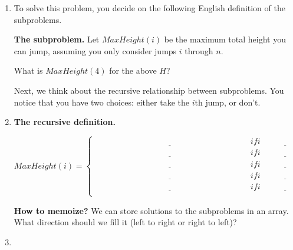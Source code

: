 \documentclass[11pt]{article}
\begin{document}
\begin{enumerate}
\begin{enumerate}
    What is the optimal set of jumps to take and what is the total height?
    \vspace{1in}

\item To solve this problem, you decide on the following English definition of the subproblems.

    \textbf{The subproblem.} Let $MaxHeight(i)$ be the maximum total height you can jump,
    assuming you only consider jumps $i$ through $n$.

    What is $MaxHeight(4)$ for the above $H$?
    \vspace{1in}

    Next, we think about the recursive relationship between subproblems.  You notice that you have two
    choices: either take the $i$th jump, or don't.
    \item 
    \textbf{The recursive definition.} 


    \begin{equation*}
        MaxHeight(i) =
        \begin{cases}
        \underline{\hspace{3in}} & if i \underline{\hspace{1in}} \\
        \underline{\hspace{3in}} & if i \underline{\hspace{1in}} \\
        \underline{\hspace{3in}} & if i \underline{\hspace{1in}} \\
        \underline{\hspace{3in}} & if i \underline{\hspace{1in}} \\
        \underline{\hspace{3in}} & if i \underline{\hspace{1in}} \\
        \end{cases}
    \end{equation*}

    \newpage

    \textbf{How to memoize?}
    We can store solutions to the subproblems in an array. What direction should we fill it (left to right or right to left)?
    \vspace{1in}

    \item 


\end{enumerate}
\end{enumerate}
\end{document}
